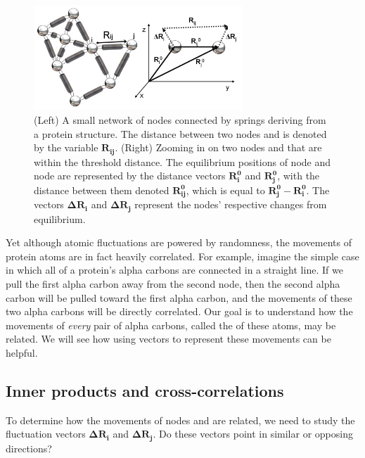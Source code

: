 \begin{figure}[h]
	\centering
	\mySfFamily
	\includegraphics[width = 0.7\textwidth]{../images/gaussian_fluctuations.png}
	\caption{(Left) A small network of nodes connected by springs deriving from a protein structure. The distance between two nodes  and  is denoted by the variable $\textbf{R}_\textbf{ij}$. (Right) Zooming in on two nodes  and  that are within the threshold distance. The equilibrium positions of node  and node  are represented by the distance vectors $ \textbf{R}_\textbf{i}^\textbf{0} $ and $\textbf{R}_\textbf{j}^\textbf{0}$, with the distance between them denoted $\textbf{R}_{\textbf{ij}}^\textbf{0}$, which is equal to $\textbf{R}_\textbf{j}^\textbf{0} - \textbf{R}_\textbf{i}^\textbf{0}$. The vectors $\mathbf{\Delta} \textbf{R}_\textbf{i} $ and $ \mathbf{\Delta} \textbf{R}_\textbf{j}$ represent the nodes' respective changes from equilibrium.}
	\label{fig:gaussian_fluctuations}
\end{figure}

Yet although atomic fluctuations are powered by randomness, the movements of protein atoms are in fact heavily correlated. For example, imagine the simple case in which all of a protein's alpha carbons are connected in a straight line. If we pull the first alpha carbon away from the second node, then the second alpha carbon will be pulled toward the first alpha carbon, and the movements of these two alpha carbons will be directly correlated. Our goal is to understand how the movements of \textit{every} pair of alpha carbons, called the  of these atoms, may be related. We will see how using vectors to represent these movements can be helpful.

\FloatBarrier
{}
\subsection{Inner products and cross-correlations}

To determine how the movements of nodes  and  are related, we need to study the fluctuation vectors $ \mathbf{\Delta R_i} $ and $\mathbf{\Delta R_j}$. Do these vectors point in similar or opposing directions?

